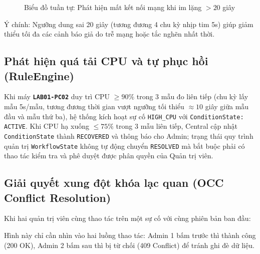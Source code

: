 \documentclass[12pt,a4paper]{article}
\begin{document}
\begin{figure}[H]
{
}
  \caption{Biểu đồ tuần tự: Phát hiện mất kết nối mạng khi im lặng $> 20$ giây}
  \label{fig:seq_liveness}
\end{figure}

Ý chính: Ngưỡng dung sai 20 giây (tương đương 4 chu kỳ nhịp tim 5s) giúp giảm thiểu tối đa các cảnh báo giả do trễ mạng hoặc tắc nghẽn nhất thời.

\subsection{Phát hiện quá tải CPU và tự phục hồi (RuleEngine)}
Khi máy \textbf{\texttt{LAB01-PC02}} duy trì CPU $\ge 90\%$ trong 3 mẫu đo liên tiếp (chu kỳ lấy mẫu 5s/mẫu, tương đương thời gian vượt ngưỡng tối thiểu $\approx 10$ giây giữa mẫu đầu và mẫu thứ ba), hệ thống kích hoạt sự cố \texttt{HIGH\_CPU} với \texttt{ConditionState: ACTIVE}. Khi CPU hạ xuống $\le 75\%$ trong 3 mẫu liên tiếp, Central cập nhật \texttt{ConditionState} thành \texttt{RECOVERED} và thông báo cho Admin; trạng thái quy trình quản trị \texttt{WorkflowState} không tự động chuyển \texttt{RESOLVED} mà bắt buộc phải có thao tác kiểm tra và phê duyệt được phân quyền của Quản trị viên.

\subsection{Giải quyết xung đột khóa lạc quan (OCC Conflict Resolution)}
Khi hai quản trị viên cùng thao tác trên một sự cố với cùng phiên bản ban đầu:

Hình này chỉ cần nhìn vào hai luồng thao tác: Admin 1 bấm trước thì thành công (200 OK), Admin 2 bấm sau thì bị từ chối (409 Conflict) để tránh ghi đè dữ liệu.
\end{document}
